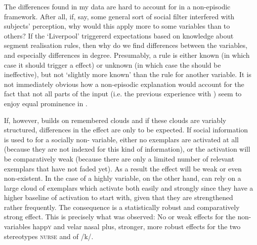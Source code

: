 The  differences found in my data are hard to account for in a non-episodic framework.
After all, if, say, some general sort of social filter \parencite[cf.][]{niedzielski1999} interfered with subjects' perception, why would this apply more to some variables than to others?
If the  \enquote*{Liverpool} triggererd expectations based on knowledge about  segment realisation rules, then why do we find differences between the variables, and especially differences in degree.
Presumably, a rule is either known (in which case it should trigger a  effect) or unknown (in which case the  should be ineffective), but not \enquote*{slightly more known} than the rule for another variable.
It is not immediately obvious how a non-episodic explanation would account for the fact that not all parts of the input (i.e. the previous experience with ) seem to enjoy equal prominence in .

If, however,  builds on remembered  clouds and if these clouds are variably structured, differences in the  effect are only to be expected.
If social information is used to  for a socially non- variable, either no exemplars are activated at all (because they are not indexed for this kind of information), or the activation will be comparatively weak (because there are only a limited number of relevant exemplars that have not faded yet).
As a result the  effect will be weak or even non-existent.
In the case of a highly  variable, on the other hand,  can rely on a large cloud of exemplars which activate both easily and strongly since they have a higher baseline of activation to start with, given that they are strengthened rather frequently.
The consequence is a statistically robust and comparatively strong  effect.
This is precisely what was observed: No or weak  effects for the non- variables happ\textsc{y} and velar nasal plus, stronger, more robust  effects for the two stereotypes \textsc{nurse} and  of /k/.

